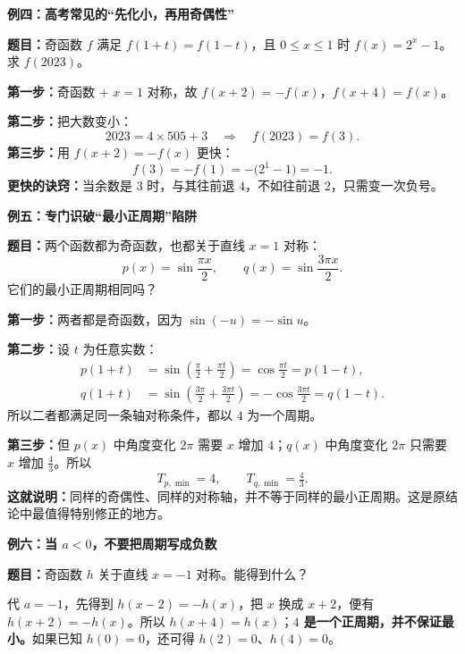 \clearpage
\begin{examplebox}
\textbf{\textcolor{CExample}{例四：高考常见的“先化小，再用奇偶性”}}



\textbf{题目：}奇函数 $f$ 满足 $f(1+t)=f(1-t)$，且 $0\le x\le1$ 时 $f(x)=2^x-1$。求 $f(2023)$。

\textbf{第一步：}奇函数 $+$ $x=1$ 对称，故 $f(x+2)=-f(x)$，$f(x+4)=f(x)$。

\textbf{第二步：}把大数变小：
\[
2023=4\times505+3\quad\Rightarrow\quad f(2023)=f(3).
\]
\textbf{第三步：}用 $f(x+2)=-f(x)$ 更快：
\[
f(3)=-f(1)=-\bigl(2^1-1\bigr)=\boxed{-1}.
\]
\textbf{更快的诀窍：}当余数是 $3$ 时，与其往前退 $4$，不如往前退 $2$，只需变一次负号。

\medskip

\end{examplebox}
\clearpage
\begin{examplebox}
\textbf{\textcolor{CExample}{例五：专门识破“最小正周期”陷阱}}



\textbf{题目：}两个函数都为奇函数，也都关于直线 $x=1$ 对称：
\[
p(x)=\sin\frac{\pi x}{2},\qquad q(x)=\sin\frac{3\pi x}{2}.
\]
它们的最小正周期相同吗？

\textbf{第一步：}两者都是奇函数，因为 $\sin(-u)=-\sin u$。

\textbf{第二步：}设 $t$ 为任意实数：
\[
\begin{aligned}
p(1+t)&=\sin(\tfrac\pi2+\tfrac{\pi t}{2})=\cos\tfrac{\pi t}{2}=p(1-t),\\
q(1+t)&=\sin(\tfrac{3\pi}{2}+\tfrac{3\pi t}{2})=-\cos\tfrac{3\pi t}{2}=q(1-t).
\end{aligned}
\]
所以二者都满足同一条轴对称条件，都以 $4$ 为一个周期。

\textbf{第三步：}但 $p(x)$ 中角度变化 $2\pi$ 需要 $x$ 增加 $4$；$q(x)$ 中角度变化 $2\pi$ 只需要 $x$ 增加 $\frac43$。所以
\[
\boxed{T_{p,\min}=4,\qquad T_{q,\min}=\tfrac43}.
\]
\textbf{这就说明：}同样的奇偶性、同样的对称轴，并不等于同样的最小正周期。这是原结论中最值得特别修正的地方。

\medskip

\end{examplebox}
\clearpage
\begin{examplebox}
\textbf{\textcolor{CExample}{例六：当 $a<0$，不要把周期写成负数}}



\textbf{题目：}奇函数 $h$ 关于直线 $x=-1$ 对称。能得到什么？

代 $a=-1$，先得到 $h(x-2)=-h(x)$，把 $x$ 换成 $x+2$，便有 $h(x+2)=-h(x)$。所以 $h(x+4)=h(x)$；\textbf{$4$ 是一个正周期，并不保证最小。}如果已知 $h(0)=0$，还可得 $h(2)=0$、$h(4)=0$。
\end{examplebox}
